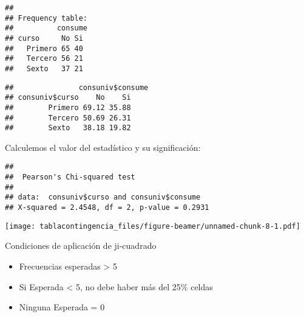 \documentclass[ignorenonframetext,]{beamer}
\providecommand{\tightlist}{%
  \setlength{\itemsep}{0pt}\setlength{\parskip}{0pt}}
\begin{document}
\begin{frame}[fragile]

\begin{verbatim}
## 
## Frequency table:
##          consume
## curso     No Si
##   Primero 65 40
##   Tercero 56 21
##   Sexto   37 21
\end{verbatim}

\end{frame}

\begin{frame}[fragile]

\begin{verbatim}
##               consuniv$consume
## consuniv$curso    No    Si
##        Primero 69.12 35.88
##        Tercero 50.69 26.31
##        Sexto   38.18 19.82
\end{verbatim}

\end{frame}

\begin{frame}[fragile]

Calculemos el valor del estadístico y su significación:

\begin{verbatim}
## 
##  Pearson's Chi-squared test
## 
## data:  consuniv$curso and consuniv$consume
## X-squared = 2.4548, df = 2, p-value = 0.2931
\end{verbatim}

\end{frame}

\begin{frame}

\texttt{[image: tablacontingencia\_files/figure-beamer/unnamed-chunk-8-1.pdf]}

\end{frame}

\begin{frame}

\begin{block}{Condiciones de aplicación de ji-cuadrado}

\begin{itemize}
\tightlist
\item
  Frecuencias esperadas \textgreater{} 5\\
\item
  Si Esperada \textless{} 5, no debe haber más del 25\% celdas\\
\item
  Ninguna Esperada = 0
\end{itemize}

\end{block}

\end{frame}
\end{document}
